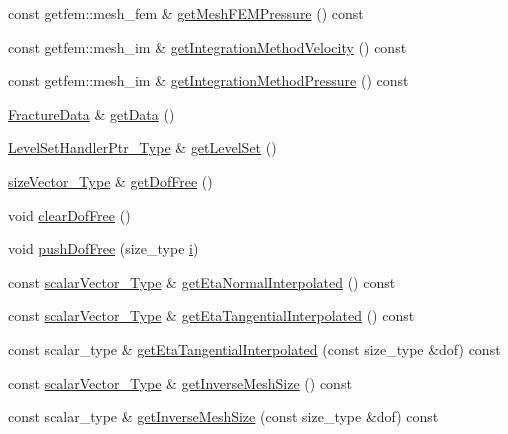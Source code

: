 \begin{DoxyCompactItemize}
const getfem\-::mesh\-\_\-fem \& \hyperlink{classFractureHandler_a6dc20a9624f9dff49b1c58f0dd261002}{get\-Mesh\-F\-E\-M\-Pressure} () const 
\item 
const getfem\-::mesh\-\_\-im \& \hyperlink{classFractureHandler_afe4c174c17862ed30b99ebe4a80aa695}{get\-Integration\-Method\-Velocity} () const 
\item 
const getfem\-::mesh\-\_\-im \& \hyperlink{classFractureHandler_ad7afd53439c3067f46a0fb6e1473d661}{get\-Integration\-Method\-Pressure} () const 
\item 
\hyperlink{classFractureData}{Fracture\-Data} \& \hyperlink{classFractureHandler_a68ed77a8d9816a472700ee4bcf2f505d}{get\-Data} ()
\item 
\hyperlink{LevelSetHandler_8h_aba343569cb3213c103252f69c39cad0b}{Level\-Set\-Handler\-Ptr\-\_\-\-Type} \& \hyperlink{classFractureHandler_af37ab12a17f812a960da2aa71699ba0f}{get\-Level\-Set} ()
\item 
\hyperlink{Core_8h_a83c51913d041a5001e8683434c09857f}{size\-Vector\-\_\-\-Type} \& \hyperlink{classFractureHandler_a509c3ffa6d2dd0fa7458ecbe5fb81360}{get\-Dof\-Free} ()
\item 
void \hyperlink{classFractureHandler_a9d4efa6f97a7e1fc6775037037b76f8a}{clear\-Dof\-Free} ()
\item 
void \hyperlink{classFractureHandler_a98931107f39ccff8789014256dcfa9a5}{push\-Dof\-Free} (size\-\_\-type \hyperlink{matrici_8m_a6f6ccfcf58b31cb6412107d9d5281426}{i})
\item 
const \hyperlink{Core_8h_a4e75b5863535ba1dd79942de2846eff0}{scalar\-Vector\-\_\-\-Type} \& \hyperlink{classFractureHandler_ac5cab221c35c03c72b264d73564d5e38}{get\-Eta\-Normal\-Interpolated} () const 
\item 
const \hyperlink{Core_8h_a4e75b5863535ba1dd79942de2846eff0}{scalar\-Vector\-\_\-\-Type} \& \hyperlink{classFractureHandler_a06b6f81d62ccd91ec1253cd41ffae808}{get\-Eta\-Tangential\-Interpolated} () const 
\item 
const scalar\-\_\-type \& \hyperlink{classFractureHandler_a47c7f4161817ebf6cd978cf6b2caa74f}{get\-Eta\-Tangential\-Interpolated} (const size\-\_\-type \&dof) const 
\item 
const \hyperlink{Core_8h_a4e75b5863535ba1dd79942de2846eff0}{scalar\-Vector\-\_\-\-Type} \& \hyperlink{classFractureHandler_a3f78aef488ef82ac8384bdd9e39a9be5}{get\-Inverse\-Mesh\-Size} () const 
\item 
const scalar\-\_\-type \& \hyperlink{classFractureHandler_a1e1ba24caa1e789b199252c3c34f696d}{get\-Inverse\-Mesh\-Size} (const size\-\_\-type \&dof) const 

\end{DoxyCompactItemize}
